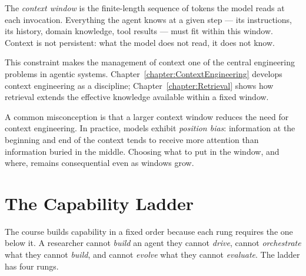 The \emph{context window} is the finite-length sequence of tokens the model reads at each invocation.
Everything the agent knows at a given step — its instructions, its history, domain knowledge, tool results — must fit within this window.
Context is not persistent: what the model does not read, it does not know.

This constraint makes the management of context one of the central engineering problems in agentic systems.
Chapter~\ref{chapter:ContextEngineering} develops context engineering as a discipline; Chapter~\ref{chapter:Retrieval} shows how retrieval extends the effective knowledge available within a fixed window.

\begin{remark}
A common misconception is that a larger context window reduces the need for context engineering.
In practice, models exhibit \emph{position bias}: information at the beginning and end of the context tends to receive more attention than information buried in the middle.
Choosing what to put in the window, and where, remains consequential even as windows grow.
\end{remark}

\section{The Capability Ladder}
\label{section:CapabilityLadder}

The course builds capability in a fixed order because each rung requires the one below it.
A researcher cannot \emph{build} an agent they cannot \emph{drive}, cannot \emph{orchestrate} what they cannot \emph{build}, and cannot \emph{evolve} what they cannot \emph{evaluate}.
The ladder has four rungs.

